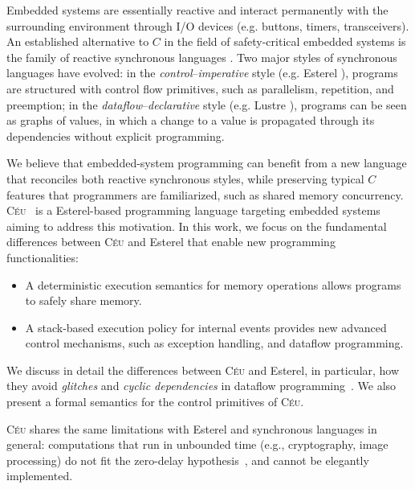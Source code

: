 \documentclass{acm_proc_article-sp}
\newcommand{\CEU}{\textsc{C\'{e}u}\xspace}
\newcommand{\1}{\;}
\newcommand{\2}{\;\;}
\newcommand{\3}{\;\;\;}
\newcommand{\5}{\;\;\;\;\;}
\begin{document}
Embedded systems are essentially reactive and interact permanently with the 
surrounding environment through I/O devices (e.g. buttons, timers, 
transceivers).
%
An established alternative to $C$ in the field of safety-critical embedded 
systems is the family of reactive synchronous languages \cite{rp.twelve}.
Two major styles of synchronous languages have evolved:
in the \emph{control}--\emph{imperative} style (e.g. Esterel 
\cite{esterel.design}), programs are structured with control flow primitives, 
such as parallelism, repetition, and preemption;
in the \emph{dataflow}--\emph{declarative} style (e.g. Lustre 
\cite{lustre.ieee91}), programs can be seen as graphs of values, in which a 
change to a value is propagated through its dependencies without explicit 
programming.

We believe that embedded-system programming can benefit from a new language 
that reconciles both reactive synchronous styles, while preserving typical $C$ 
features that programmers are familiarized, such as shared memory concurrency.
%
\CEU~\cite{ceu.sensys}
is a Esterel-based programming language targeting embedded systems aiming to 
address this motivation.
In this work, we focus on the fundamental differences between \CEU and Esterel 
that enable new programming functionalities:
%
\begin{itemize}
\item A deterministic execution semantics for memory operations allows programs 
to safely share memory.
%
\item A stack-based execution policy for internal events provides new advanced 
control mechanisms, such as exception handling, and dataflow programming.
\end{itemize}

We discuss in detail the differences between \CEU and Esterel, in particular, 
how they avoid \emph{glitches} and \emph{cyclic dependencies} in dataflow 
programming~\cite{frp.survey}.
We also present a formal semantics for the control primitives of \CEU.

\CEU shares the same limitations with Esterel and synchronous languages in 
general:
computations that run in unbounded time (e.g., cryptography, image processing) 
do not fit the zero-delay hypothesis~\cite{rp.hypothesis}, and cannot be 
elegantly implemented.
\end{document}
